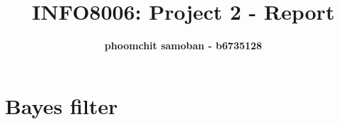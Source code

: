 \documentclass{article}
\begin{document}

\title{\Large{INFO8006: Project 2 - Report}}

\vspace{1cm}

\author{\small{\bf phoomchit samoban - b6735128}}

\maketitle


\section{Bayes filter}
\end{document}
